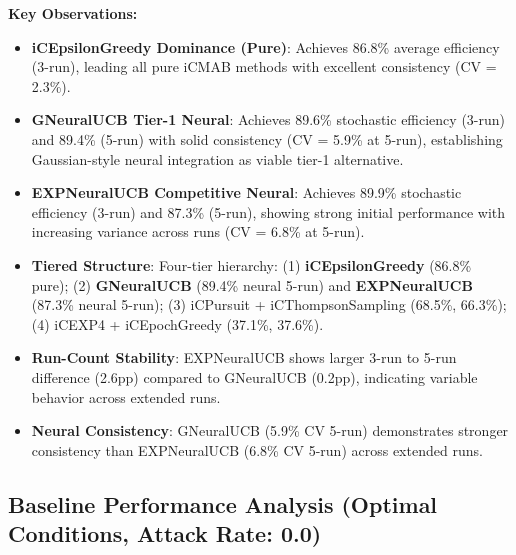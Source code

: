 \documentclass[12pt,a4paper]{article}
\newcommand{\primarytext}[1]{\textcolor{primaryblue}{\textbf{#1}}}
\newcommand{\secondarytext}[1]{\textcolor{secondaryblue}{\textbf{#1}}}
\newcommand{\warning}[1]{\textcolor{warningred}{\textbf{#1}}}
\newcommand{\legacy}[1]{\textcolor{legacycolor}{\textbf{#1}}}
\newcommand{\neural}[1]{\textcolor{neuralcolor}{\textbf{#1}}}
\begin{document}
\begin{tcolorbox}[colback=tableheader,colframe=primaryblue,title=\textbf{Primary iCMAB Performance Results (Stochastic Environment, Attack Rate: 0.25)}]
\textbf{Key Observations:}
\begin{itemize}
\item \primarytext{iCEpsilonGreedy Dominance (Pure)}: Achieves 86.8\% average efficiency (3-run), leading all pure iCMAB methods with excellent consistency (CV = 2.3\%).
\item \neural{GNeuralUCB Tier-1 Neural}: Achieves 89.6\% stochastic efficiency (3-run) and 89.4\% (5-run) with solid consistency (CV = 5.9\% at 5-run), establishing Gaussian-style neural integration as viable tier-1 alternative.
\item \legacy{EXPNeuralUCB Competitive Neural}: Achieves 89.9\% stochastic efficiency (3-run) and 87.3\% (5-run), showing strong initial performance with increasing variance across runs (CV = 6.8\% at 5-run).
\item \secondarytext{Tiered Structure}: Four-tier hierarchy: (1) \primarytext{iCEpsilonGreedy} (86.8\% pure); (2) \neural{GNeuralUCB} (89.4\% neural 5-run) and \legacy{EXPNeuralUCB} (87.3\% neural 5-run); (3) iCPursuit + iCThompsonSampling (68.5\%, 66.3\%); (4) iCEXP4 + iCEpochGreedy (37.1\%, 37.6\%).
\item \warning{Run-Count Stability}: EXPNeuralUCB shows larger 3-run to 5-run difference (2.6pp) compared to GNeuralUCB (0.2pp), indicating variable behavior across extended runs.
\item \neural{Neural Consistency}: GNeuralUCB (5.9\% CV 5-run) demonstrates stronger consistency than EXPNeuralUCB (6.8\% CV 5-run) across extended runs.
\end{itemize}
\end{tcolorbox}

\subsection{Baseline Performance Analysis (Optimal Conditions, Attack Rate: 0.0)}
\end{document}
